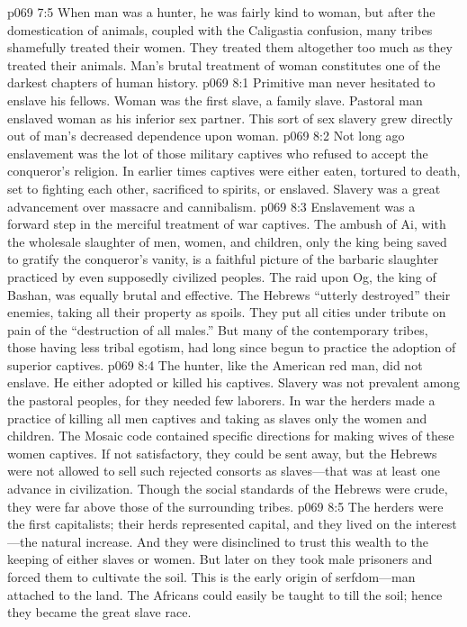 \vs p069 7:5 When man was a hunter, he was fairly kind to woman, but after the domestication of animals, coupled with the Caligastia confusion, many tribes shamefully treated their women. They treated them altogether too much as they treated their animals. Man’s brutal treatment of woman constitutes one of the darkest chapters of human history.
\vs p069 8:1 Primitive man never hesitated to enslave his fellows. Woman was the first slave, a family slave. Pastoral man enslaved woman as his inferior sex partner. This sort of sex slavery grew directly out of man’s decreased dependence upon woman.
\vs p069 8:2 Not long ago enslavement was the lot of those military captives who refused to accept the conqueror’s religion. In earlier times captives were either eaten, tortured to death, set to fighting each other, sacrificed to spirits, or enslaved. Slavery was a great advancement over massacre and cannibalism.
\vs p069 8:3 Enslavement was a forward step in the merciful treatment of war captives. The ambush of Ai, with the wholesale slaughter of men, women, and children, only the king being saved to gratify the conqueror’s vanity, is a faithful picture of the barbaric slaughter practiced by even supposedly civilized peoples. The raid upon Og, the king of Bashan, was equally brutal and effective. The Hebrews “utterly destroyed” their enemies, taking all their property as spoils. They put all cities under tribute on pain of the “destruction of all males.” But many of the contemporary tribes, those having less tribal egotism, had long since begun to practice the adoption of superior captives.
\vs p069 8:4 The hunter, like the American red man, did not enslave. He either adopted or killed his captives. Slavery was not prevalent among the pastoral peoples, for they needed few laborers. In war the herders made a practice of killing all men captives and taking as slaves only the women and children. The Mosaic code contained specific directions for making wives of these women captives. If not satisfactory, they could be sent away, but the Hebrews were not allowed to sell such rejected consorts as slaves---that was at least one advance in civilization. Though the social standards of the Hebrews were crude, they were far above those of the surrounding tribes.
\vs p069 8:5 The herders were the first capitalists; their herds represented capital, and they lived on the interest---the natural increase. And they were disinclined to trust this wealth to the keeping of either slaves or women. But later on they took male prisoners and forced them to cultivate the soil. This is the early origin of serfdom---man attached to the land. The Africans could easily be taught to till the soil; hence they became the great slave race.
